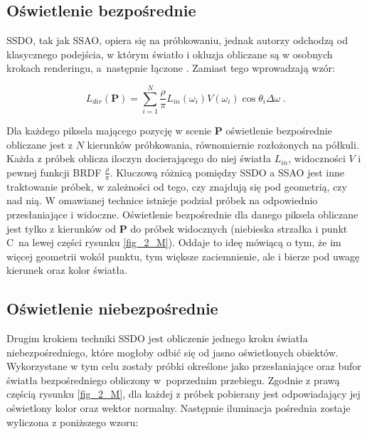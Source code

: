 		\subsection{Oświetlenie bezpośrednie}
		\label{t:teoria:ssdo:direct}
		
		SSDO, tak jak SSAO, opiera się na próbkowaniu, jednak autorzy odchodzą od klasycznego podejścia, w którym światło i okluzja obliczane są w osobnych krokach renderingu, a~następnie łączone \cite{ssdo}. Zamiast tego wprowadzają wzór:
		
		\begin{equation}
		L_{dir}(\mathbf{P}) = \sum_{i=1}^{N}\frac{\rho}{\pi}L_{in}(\omega_{i})V(\omega_{i})\cos\theta_{i}\Delta\omega\ .
		\end{equation}
		
		Dla każdego piksela mającego pozycję w scenie \(\mathbf{P}\) oświetlenie bezpośrednie obliczane jest z \(N\) kierunków próbkowania, równomiernie rozłożonych na półkuli. Każda z próbek oblicza iloczyn docierającego do niej światła \(L_{in}\), widoczności \(V\) i pewnej funkcji BRDF \(\frac{\rho}{\pi}\). Kluczową różnicą pomiędzy SSDO a SSAO jest inne traktowanie próbek, w zależności od tego, czy znajdują się pod geometrią, czy nad nią. W omawianej technice istnieje podział próbek na odpowiednio przesłaniające i widoczne. Oświetlenie bezpośrednie dla danego piksela obliczane jest tylko z kierunków od \(\mathbf{P}\) do próbek widocznych (niebieska strzałka i punkt C~na lewej części rysunku \ref{fig_2_M}). Oddaje to ideę mówiącą o tym, że im więcej geometrii wokół punktu, tym większe zaciemnienie, ale i bierze pod uwagę kierunek oraz kolor światła.
		
		
		\subsection{Oświetlenie niebezpośrednie}
		\label{t:teoria:ssdo:indirect}
		
		Drugim krokiem techniki SSDO jest obliczenie jednego kroku światła niebezpośredniego, które mogłoby odbić się od jasno oświetlonych obiektów. Wykorzystane w tym celu zostały próbki określone jako przesłaniające oraz bufor światła bezpośredniego obliczony w~poprzednim przebiegu. Zgodnie z prawą częścią rysunku \ref{fig_2_M}, dla każdej z próbek pobierany jest odpowiadający jej oświetlony kolor oraz wektor normalny. Następnie iluminacja pośrednia zostaje wyliczona z poniższego wzoru:
		 
